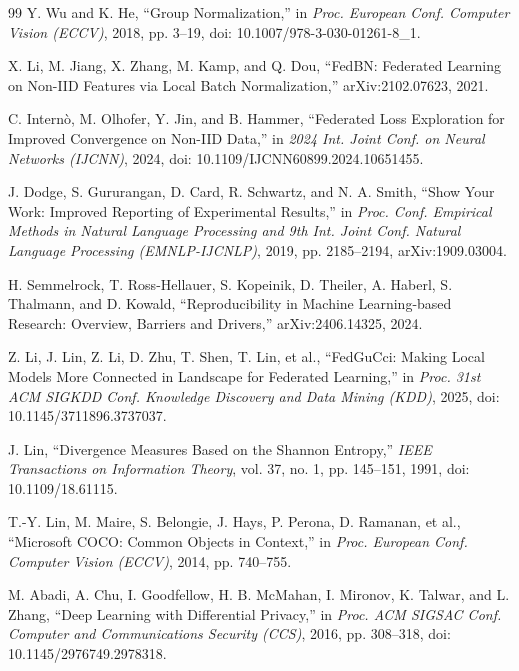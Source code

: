 \documentclass[11pt]{article}
\begin{document}
\begin{thebibliography}{99}
 Y. Wu and K. He, ``Group Normalization,'' in \emph{Proc. European Conf. Computer Vision (ECCV)}, 2018, pp. 3--19, doi: 10.1007/978-3-030-01261-8\_1.

 X. Li, M. Jiang, X. Zhang, M. Kamp, and Q. Dou, ``FedBN: Federated Learning on Non-IID Features via Local Batch Normalization,'' arXiv:2102.07623, 2021.

 C. Intern\`o, M. Olhofer, Y. Jin, and B. Hammer, ``Federated Loss Exploration for Improved Convergence on Non-IID Data,'' in \emph{2024 Int. Joint Conf. on Neural Networks (IJCNN)}, 2024, doi: 10.1109/IJCNN60899.2024.10651455.

 J. Dodge, S. Gururangan, D. Card, R. Schwartz, and N. A. Smith, ``Show Your Work: Improved Reporting of Experimental Results,'' in \emph{Proc. Conf. Empirical Methods in Natural Language Processing and 9th Int. Joint Conf. Natural Language Processing (EMNLP-IJCNLP)}, 2019, pp. 2185--2194, arXiv:1909.03004.

 H. Semmelrock, T. Ross-Hellauer, S. Kopeinik, D. Theiler, A. Haberl, S. Thalmann, and D. Kowald, ``Reproducibility in Machine Learning-based Research: Overview, Barriers and Drivers,'' arXiv:2406.14325, 2024.

 Z. Li, J. Lin, Z. Li, D. Zhu, T. Shen, T. Lin, et al., ``FedGuCci: Making Local Models More Connected in Landscape for Federated Learning,'' in \emph{Proc. 31st ACM SIGKDD Conf. Knowledge Discovery and Data Mining (KDD)}, 2025, doi: 10.1145/3711896.3737037.

 J. Lin, ``Divergence Measures Based on the Shannon Entropy,'' \emph{IEEE Transactions on Information Theory}, vol. 37, no. 1, pp. 145--151, 1991, doi: 10.1109/18.61115.

 T.-Y. Lin, M. Maire, S. Belongie, J. Hays, P. Perona, D. Ramanan, et al., ``Microsoft COCO: Common Objects in Context,'' in \emph{Proc. European Conf. Computer Vision (ECCV)}, 2014, pp. 740--755.

 M. Abadi, A. Chu, I. Goodfellow, H. B. McMahan, I. Mironov, K. Talwar, and L. Zhang, ``Deep Learning with Differential Privacy,'' in \emph{Proc. ACM SIGSAC Conf. Computer and Communications Security (CCS)}, 2016, pp. 308--318, doi: 10.1145/2976749.2978318.
\end{thebibliography}
\end{document}
